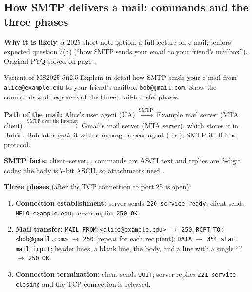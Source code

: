 \subsection{How SMTP delivers a mail: commands and the three phases}\label{iq:C16}
    

\textbf{Why it is likely:} a 2025 short-note option; a full lecture on e-mail; seniors' expected question 7(a) (``how SMTP sends your email to your friend's mailbox''). Original PYQ solved on page~\pageref{q:MS2025-5ii}.

\begin{question}{Variant of MS2025-5ii}{2.5}
Explain in detail how SMTP sends your e-mail from \texttt{alice@example.edu} to your friend's mailbox \texttt{bob@gmail.com}. Show the commands and responses of the three mail-transfer phases.
\end{question}
\begin{solution}
\textbf{Path of the mail:} Alice's user agent (UA) $\xrightarrow{\text{SMTP}}$ Example mail server (MTA client) $\xrightarrow{\text{SMTP over the Internet}}$ Gmail's mail server (MTA server), which stores it in Bob's . Bob later \emph{pulls} it with a message access agent ( or ); SMTP itself is a  protocol.

\textbf{SMTP facts:} client--server, , commands are ASCII text and replies are 3-digit codes; the body is 7-bit ASCII, so attachments need .

\textbf{Three phases} (after the TCP connection to port 25 is open):
\begin{enumerate}[label=\textbf{\arabic*.}]
\item \textbf{Connection establishment:} server sends \texttt{220 service ready}; client sends \texttt{HELO example.edu}; server replies \texttt{250 OK}.
\item \textbf{Mail transfer:} \texttt{MAIL FROM:<alice@example.edu>} $\to$ \texttt{250}; \texttt{RCPT TO:<bob@gmail.com>} $\to$ \texttt{250} (repeat for each recipient); \texttt{DATA} $\to$ \texttt{354 start mail input}; header lines, a blank line, the body, and a line with a single ``.'' $\to$ \texttt{250 OK}.
\item \textbf{Connection termination:} client sends \texttt{QUIT}; server replies \texttt{221 service closing} and the TCP connection is released.
\end{enumerate}
\end{solution}

